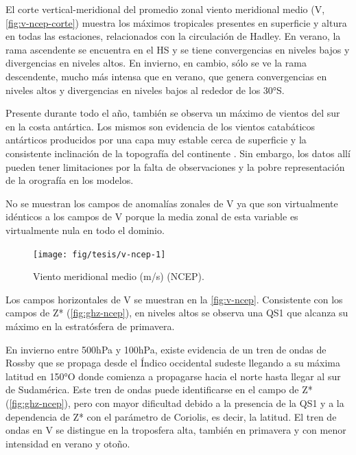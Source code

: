 \documentclass[spanish,a4paper,12pt,oneside]{book}
\begin{document}
El corte vertical-meridional del promedio zonal viento meridional medio
(V, \autoref{fig:v-ncep-corte}) muestra los máximos tropicales presentes
en superficie y altura en todas las estaciones, relacionados con la
circulación de Hadley. En verano, la rama ascendente se encuentra en el
HS y se tiene convergencias en niveles bajos y divergencias en niveles
altos. En invierno, en cambio, sólo se ve la rama descendente, mucho más
intensa que en verano, que genera convergencias en niveles altos y
divergencias en niveles bajos al rededor de los 30°S.

Presente durante todo el año, también se observa un máximo de vientos
del sur en la costa antártica. Los mismos son evidencia de los vientos
catabáticos antárticos producidos por una capa muy estable cerca de
superficie y la consistente inclinación de la topografía del continente
\citep{King1997}. Sin embargo, los datos allí pueden tener limitaciones
por la falta de observaciones y la pobre representación de la orografía
en los modelos.

No se muestran los campos de anomalías zonales de V ya que son
virtualmente idénticos a los campos de V porque la media zonal de esta
variable es virtualmente nula en todo el dominio.

\begin{landscape}\begin{figure}

{\centering \texttt{[image: fig/tesis/v-ncep-1]} 

}

\caption{Viento meridional medio (m/s) (NCEP).}\label{fig:v-ncep}
\end{figure}
\end{landscape}

Los campos horizontales de V se muestran en la \autoref{fig:v-ncep}.
Consistente con los campos de Z* (\autoref{fig:ghz-ncep}), en niveles
altos se observa una QS1 que alcanza su máximo en la estratósfera de
primavera.

En invierno entre 500hPa y 100hPa, existe evidencia de un tren de ondas
de Rossby que se propaga desde el Índico occidental sudeste llegando a
su máxima latitud en 150°O donde comienza a propagarse hacia el norte
hasta llegar al sur de Sudamérica. Este tren de ondas puede
identificarse en el campo de Z* (\autoref{fig:ghz-ncep}), pero con mayor
dificultad debido a la presencia de la QS1 y a la dependencia de Z* con
el parámetro de Coriolis, es decir, la latitud. El tren de ondas en V se
distingue en la troposfera alta, también en primavera y con menor
intensidad en verano y otoño.
\end{document}
